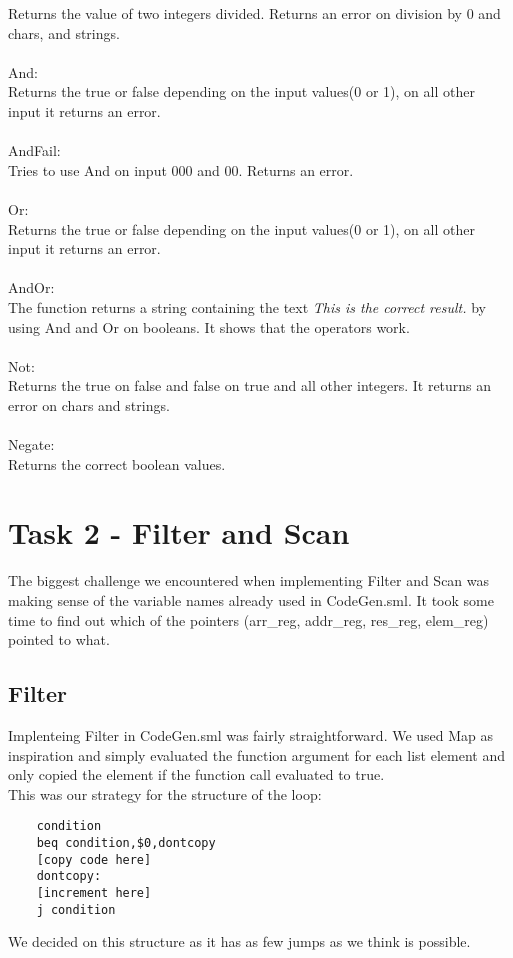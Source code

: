 \documentclass{article}
\begin{document}
Returns the value of two integers divided. Returns an error on division by 0 and chars, and strings.\\
\\
And:\\
Returns the true or false depending on the input values(0 or 1), on all other input it returns an error.\\
\\
AndFail:\\
Tries to use And on input 000 and 00. Returns an error.\\
\\
Or:\\
Returns the true or false depending on the input values(0 or 1), on all other input it returns an error.\\
\\
AndOr:\\
The function returns a string containing the text \textit{This is the correct result.} by using And and Or on booleans. It shows that the operators work.\\
\\
Not:\\
Returns the true on false and false on true and all other integers. It returns an error on chars and strings.\\
\\
Negate:\\
Returns the correct boolean values.

\newpage

\section{Task 2 - Filter and Scan}

The biggest challenge we encountered when implementing Filter and Scan was making sense of the variable names already used in CodeGen.sml. It took some time to find out which of the pointers (arr\_reg, addr\_reg, res\_reg, elem\_reg) pointed to what.

\subsection{Filter}
Implenteing Filter in CodeGen.sml was fairly straightforward. We used Map as inspiration and simply evaluated the function argument for each list element and only copied the element if the function call evaluated to true.\\

\noindent This was our strategy for the structure of the loop:
\begin{lstlisting}
    condition
    beq condition,$0,dontcopy
    [copy code here]
    dontcopy:
    [increment here]
    j condition
\end{lstlisting}
We decided on this structure as it has as few jumps as we think is possible.
\end{document}
